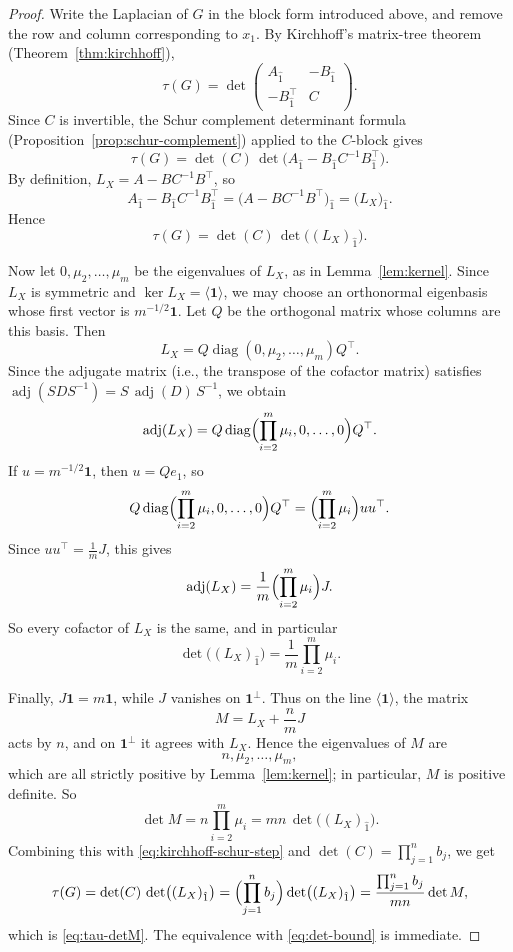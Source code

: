 \documentclass[twoside, reqno]{amsart}
\theoremstyle{definition}
\theoremstyle{remark}
\newcommand{\diag}{\operatorname{diag}}
\begin{document}
\begin{proof}
Write the Laplacian of $G$ in the block form introduced above, 
and remove the row and column corresponding to $x_1$. 
By Kirchhoff's matrix-tree theorem (Theorem~\ref{thm:kirchhoff}),
\[
\tau(G)
=\det\begin{pmatrix}
A_{\hat 1} & -B_{\hat 1}\\
-B_{\hat 1}^{\top} & C
\end{pmatrix}.
\]
Since $C$ is invertible, the Schur complement determinant formula 
(Proposition~\ref{prop:schur-complement}) applied to the $C$-block gives
\[
\tau(G)
=\det(C)\,\det\bigl(A_{\hat 1}-B_{\hat 1}C^{-1}B_{\hat 1}^{\top}\bigr).
\]
By definition, $L_X=A-BC^{-1}B^\top$, so
\[
A_{\hat 1}-B_{\hat 1}C^{-1}B_{\hat 1}^{\top}
=\bigl(A-BC^{-1}B^\top\bigr)_{\hat 1}
=\bigl(L_X\bigr)_{\hat 1}.
\]
Hence
\begin{equation}\label{eq:kirchhoff-schur-step}
\tau(G)=\det(C)\,\det\bigl((L_X)_{\hat 1}\bigr).
\end{equation}

Now let $0,\mu_2,\dots,\mu_m$ be the eigenvalues of $L_X$, as in 
Lemma~\ref{lem:kernel}. Since $L_X$ is symmetric and 
$\ker L_X=\langle \mathbf1\rangle$, we may choose an orthonormal eigenbasis 
whose first vector is $m^{-1/2}\mathbf1$. Let $Q$ be the orthogonal matrix 
whose columns are this basis. Then
\[
L_X=Q\diag(0,\mu_2,\dots,\mu_m)Q^\top.
\]
Since the adjugate matrix (i.e., the transpose of the cofactor matrix) 
satisfies $\operatorname{adj}(SDS^{-1})=S\,\operatorname{adj}(D)\,S^{-1}$, we obtain
\[
\operatorname{adj}(L_X)
=Q\diag\Bigl(\prod_{i=2}^m\mu_i,0,\dots,0\Bigr)Q^\top.
\]
If $u=m^{-1/2}\mathbf1$, then $u=Qe_1$, so
\[
Q\diag\Bigl(\prod_{i=2}^m\mu_i,0,\dots,0\Bigr)Q^\top
=\Bigl(\prod_{i=2}^m\mu_i\Bigr)uu^\top.
\]
Since $uu^\top=\frac1m J$, this gives
\[
\operatorname{adj}(L_X)=\frac1m\Bigl(\prod_{i=2}^m\mu_i\Bigr)J.
\]
So every cofactor of $L_X$ is the same, and in particular
\[
\det\bigl((L_X)_{\hat 1}\bigr)=\frac{1}{m}\prod_{i=2}^m \mu_i.
\]

Finally, $J\mathbf1=m\mathbf1$, while $J$ vanishes on $\mathbf1^\perp$. 
Thus on the line $\langle \mathbf1\rangle$, the matrix
\[
M=L_X+\frac{n}{m}J
\]
acts by $n$, and on $\mathbf1^\perp$ it agrees with $L_X$. 
Hence the eigenvalues of $M$ are
\[
n,\mu_2,\dots,\mu_m,
\]
which are all strictly positive by Lemma~\ref{lem:kernel};
in particular, $M$ is positive definite. So
\[
\det M=n\prod_{i=2}^m\mu_i
=mn\,\det\bigl((L_X)_{\hat 1}\bigr).
\]
Combining this with \eqref{eq:kirchhoff-schur-step} 
and $\det(C)=\prod_{j=1}^n b_j$, we get
\[
\tau(G)
=\det(C)\,\det\bigl((L_X)_{\hat 1}\bigr)
=\Bigl(\prod_{j=1}^n b_j\Bigr)\det\bigl((L_X)_{\hat 1}\bigr)
=\frac{\prod_{j=1}^n b_j}{mn}\det M,
\]
which is \eqref{eq:tau-detM}. 
The equivalence with \eqref{eq:det-bound} is immediate.
\end{proof}
\end{document}
